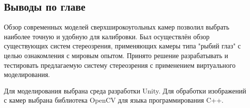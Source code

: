 \subsection{Выводы по главе}

Обзор современных моделей сверхширокоугольных камер позволил выбрать 
наиболее точную и удобную для калибровки. Был осуществлён обзор существующих
систем стереозрения, применяющих камеры типа "рыбий глаз" с целью ознакомления 
с мировым опытом. Принято решение разрабатывать и тестировать предлагаемую 
систему стереозрения с применением виртуального  моделирования. 

Для моделирования выбрана среда разработки Unity. Для обработки изображений
с камер выбрана библиотека OpenCV для языка программирования C++. 
